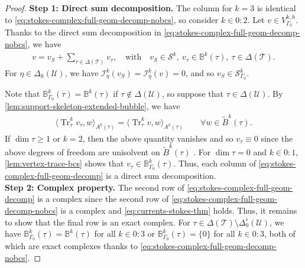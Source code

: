 \documentclass{mcom-l}
\theoremstyle{definition}
\theoremstyle{remark}
\numberwithin{equation}{section}
\DeclareMathOperator{\Tr}{Tr}
\newcommand{\mesh}[0]{\mathcal{T}}
\newcommand{\boundarymesh}[0]{\mathcal{U}}
\begin{document}
\begin{proof}	
	\noindent \textbf{Step 1: Direct sum decomposition. }
	The column for $k=3$ is identical to 
	\cref{eq:stokes-complex-full-geom-decomp-nobcs}, so 
	consider $k \in 0:2$.
	Let $v \in V_{\Gamma_0}^{k, h}$. Thanks 
	to the direct sum decomposition in 
	\cref{eq:stokes-complex-full-geom-decomp-nobcs}, we have 
	\begin{align*}
		v = v_S + \sum_{\tau \in \Delta(\mesh)} v_{\tau},
		\quad \text{with} \quad v_S \in \mathcal{S}^k, 
		\ v_{\tau} \in \mathbb{B}^k(\tau), 
		\ \tau \in \Delta(\mesh).
	\end{align*}
	For $\eta \in \Delta_k(\boundarymesh)$, we have 
	$\mathcal{I}_{\eta}^{k}(v_S) = \mathcal{I}_{\eta}^{k}(v) = 0$,
	and so $v_S \in \mathcal{S}_{\Gamma_0}^k$.
	
	Note that $\mathbb{B}_{\Gamma_0}^k(\tau) = \mathbb{B}^k(\tau)$
	if $\tau \notin \Delta(\boundarymesh)$, so 
	suppose that $\tau \in \Delta(\boundarymesh)$.
	By \cref{lem:support-skeleton-extended-bubble}, we have 
	\begin{align*}
		\langle \Tr_{\tau}^k v_{\tau}, w \rangle_{A^k(\tau)}
		= \langle \Tr_{\tau}^k v, w \rangle_{A^k(\tau)}
		\qquad \forall w \in \tilde{B}^k(\tau).
	\end{align*}
	If $\dim \tau \geq 1$ or $k = 2$, then the above quantity vanishes
	and so $v_{\tau} \equiv 0$ since 
	the above degrees of freedom are unisolvent 
	on $\tilde{B}^k(\tau)$ \cite[Lemma 5.2]{HuLiangLin25}.
	For $\dim \tau = 0$ and $k \in 0:1$, 
	\cref{lem:vertex-trace-bcs} shows that 
	$v_{\tau} \in \mathbb{B}^k_{\Gamma_0}(\tau)$.
	Thus, each column of \cref{eq:stokes-complex-full-geom-decomp}
	is a direct sum decomposition. \\
	
	\noindent \textbf{Step 2: Complex property. }
	The second row of \cref{eq:stokes-complex-full-geom-decomp} is a complex
	since the second row of \cref{eq:stokes-complex-full-geom-decomp-nobcs}
	is a complex and \cref{eq:currents-stokes-thm} holds.
	Thus, it remains to show that 
	the final row is an exact complex. For 
	$\tau \in \Delta(\mesh) \setminus \Delta_0^{\flat}(\boundarymesh)$, 
	we have $\mathbb{B}_{\Gamma_0}^k(\tau) = \mathbb{B}^k(\tau)$ 
	for all $k \in 0:3$ 
	or $\mathbb{B}_{\Gamma_0}^k(\tau) = \{0 \}$ for all $k \in 0:3$, 
	both of which are exact complexes thanks to 
	\cref{eq:stokes-complex-full-geom-decomp-nobcs}.
	

\end{proof}
\end{document}
